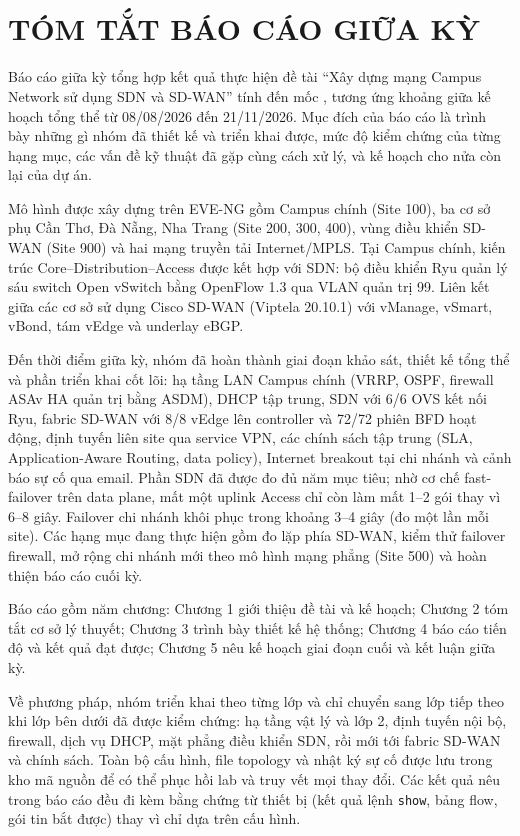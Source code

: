 \section*{\fontsize{18pt}{18pt}\selectfont\MakeUppercase{\de}\\TÓM TẮT BÁO CÁO GIỮA KỲ}

Báo cáo giữa kỳ tổng hợp kết quả thực hiện đề tài ``Xây dựng mạng Campus Network sử dụng SDN và SD-WAN'' tính đến mốc \mocbaocao{}, tương ứng khoảng giữa kế hoạch tổng thể từ 08/08/2026 đến 21/11/2026. Mục đích của báo cáo là trình bày những gì nhóm đã thiết kế và triển khai được, mức độ kiểm chứng của từng hạng mục, các vấn đề kỹ thuật đã gặp cùng cách xử lý, và kế hoạch cho nửa còn lại của dự án.

Mô hình được xây dựng trên EVE-NG gồm Campus chính (Site 100), ba cơ sở phụ Cần Thơ, Đà Nẵng, Nha Trang (Site 200, 300, 400), vùng điều khiển SD-WAN (Site 900) và hai mạng truyền tải Internet/MPLS. Tại Campus chính, kiến trúc Core--Distribution--Access được kết hợp với SDN: bộ điều khiển Ryu quản lý sáu switch Open vSwitch bằng OpenFlow 1.3 qua VLAN quản trị 99. Liên kết giữa các cơ sở sử dụng Cisco SD-WAN (Viptela 20.10.1) với vManage, vSmart, vBond, tám vEdge và underlay eBGP.

Đến thời điểm giữa kỳ, nhóm đã hoàn thành giai đoạn khảo sát, thiết kế tổng thể và phần triển khai cốt lõi: hạ tầng LAN Campus chính (VRRP, OSPF, firewall ASAv HA quản trị bằng ASDM), DHCP tập trung, SDN với 6/6 OVS kết nối Ryu, fabric SD-WAN với 8/8 vEdge lên controller và 72/72 phiên BFD hoạt động, định tuyến liên site qua service VPN, các chính sách tập trung (SLA, Application-Aware Routing, data policy), Internet breakout tại chi nhánh và cảnh báo sự cố qua email. Phần SDN đã được đo đủ năm mục tiêu; nhờ cơ chế fast-failover trên data plane, mất một uplink Access chỉ còn làm mất 1--2 gói thay vì 6--8 giây. Failover chi nhánh khôi phục trong khoảng 3--4 giây (đo một lần mỗi site). Các hạng mục đang thực hiện gồm đo lặp phía SD-WAN, kiểm thử failover firewall, mở rộng chi nhánh mới theo mô hình mạng phẳng (Site 500) và hoàn thiện báo cáo cuối kỳ.

Báo cáo gồm năm chương: Chương 1 giới thiệu đề tài và kế hoạch; Chương 2 tóm tắt cơ sở lý thuyết; Chương 3 trình bày thiết kế hệ thống; Chương 4 báo cáo tiến độ và kết quả đạt được; Chương 5 nêu kế hoạch giai đoạn cuối và kết luận giữa kỳ.

Về phương pháp, nhóm triển khai theo từng lớp và chỉ chuyển sang lớp tiếp theo khi lớp bên dưới đã được kiểm chứng: hạ tầng vật lý và lớp 2, định tuyến nội bộ, firewall, dịch vụ DHCP, mặt phẳng điều khiển SDN, rồi mới tới fabric SD-WAN và chính sách. Toàn bộ cấu hình, file topology và nhật ký sự cố được lưu trong kho mã nguồn để có thể phục hồi lab và truy vết mọi thay đổi. Các kết quả nêu trong báo cáo đều đi kèm bằng chứng từ thiết bị (kết quả lệnh \texttt{show}, bảng flow, gói tin bắt được) thay vì chỉ dựa trên cấu hình.

